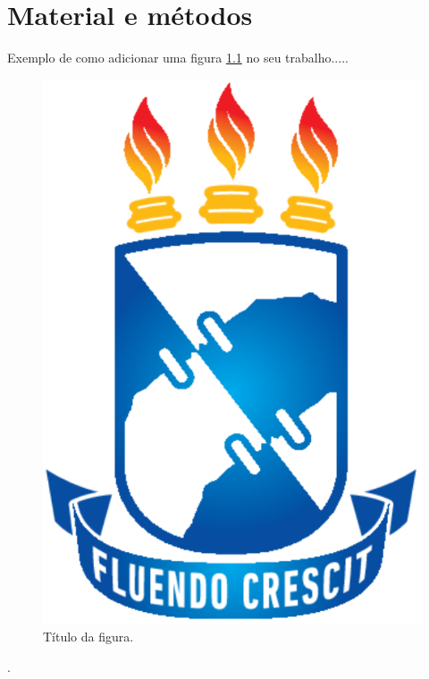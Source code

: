 \chapter{Material e métodos}

\lipsum[1-2]

Exemplo de como adicionar uma figura \ref{Imagem1} no seu trabalho.....

\begin{figure}[h]
	\centering	
	\includegraphics[scale=0.75]{Imagens/Imagem1}
	\caption{Título da figura.}
	\label{Imagem1}
\end{figure}




\lipsum[1-2].

